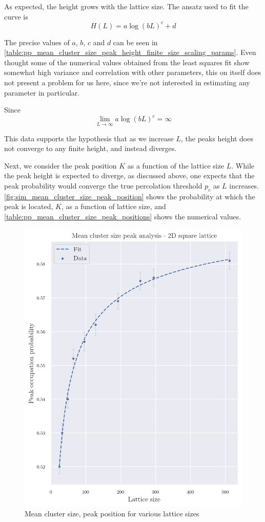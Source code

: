 As expected, the height grows with the lattice size. The ansatz used to fit the curve is
$$ 
H(L) = a \log(bL)^c + d
$$

The precise values of $a$, $b$, $c$ and $d$ can be seen in \autoref{table:pp_mean_cluster_size_peak_height_finite_size_scaling_params}. Even thought some of the numerical values obtained from the least squares fit show somewhat high variance and correlation with other parameters, this on itself does not present a problem for us here, since we're not interested in estimating any parameter in particular.

Since 
$$
\lim_{L\to\infty} a \log(bL)^c = \infty
$$

This data supports the hypothesis that as we increase $L$, the peaks height does not converge to any finite height, and instead diverges.


Next, we consider the peak position $K$ as a function of the lattice size $L$. While the peak height is expected to diverge, as discussed above, one expects that the peak probability would converge the true percolation threshold $p_c$ as $L$ increases. 
\autoref{fig:sim_mean_cluster_size_peak_position} shows the probability at which the peak is located, $K$, as a function of lattice size, and \autoref{table:pp_mean_cluster_size_peak_positions} shows the numerical values.


\begin{figure}[H]
  \includegraphics[width=\linewidth]{Images/sim_mean_cluster_size_peak_position.png}
  \caption{Mean cluster size, peak position for various lattice sizes}
  \label{fig:sim_mean_cluster_size_peak_position}
\end{figure}


